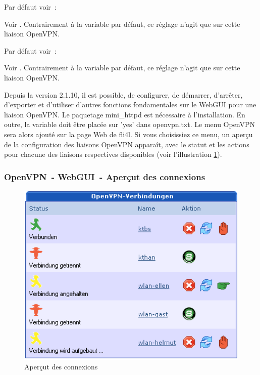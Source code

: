 \begin{description}

  Par défaut voir~: 

  Voir . Contrairement
  à la variable par défaut, ce réglage n'agit que sur cette liaison OpenVPN.


  Par défaut voir~: 

  Voir . Contrairement à
  la variable par défaut, ce réglage n'agit que sur cette liaison OpenVPN.

\end{description}

 

Depuis la version 2.1.10, il est possible, de configurer, de démarrer, d'arrêter,
d'exporter et d'utiliser d'autres fonctions fondamentales sur le WebGUI pour une
liaison OpenVPN. Le paquetage mini\_httpd est nécessaire à l'installation. En
outre, la variable  doit être placée sur 'yes' dans openvpn.txt.
Le menu OpenVPN sera alors ajouté sur la page Web de fli4l. Si vous choisissiez
ce menu, un aperçu de la configuration des liaisons OpenVPN apparaît, avec le
statut et les actions pour chacune des liaisons respectives disponibles
(voir l'illustration \ref{fig:guiact}).

\subsubsection{OpenVPN~- WebGUI~- Aperçut des connexions}
  \begin{figure}[!h]
    \centering
    \includegraphics[width=400pt]{verbindungen}
    \caption{Aperçut des connexions}
    \label{fig:guiact}
  \end{figure}


